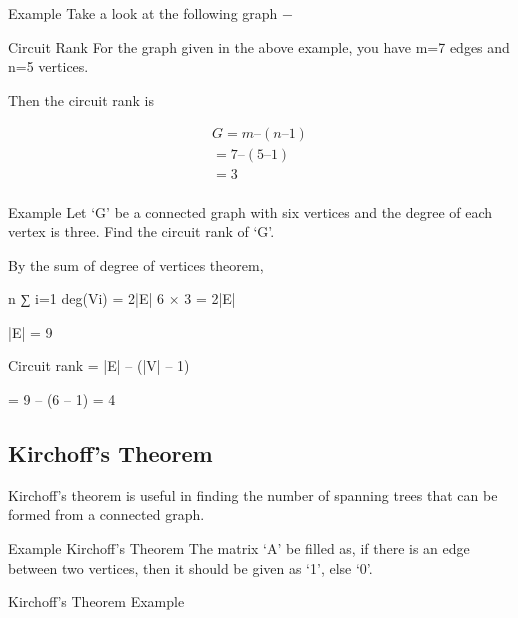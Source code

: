 Example
Take a look at the following graph −

Circuit Rank
For the graph given in the above example, you have m=7 edges and n=5 vertices.

Then the circuit rank is

\begin{eqnarray}
G = m – (n – 1)\\
  = 7 – (5 – 1)\\
  = 3\\
\end{eqnarray}

Example
Let ‘G’ be a connected graph with six vertices and the degree of each vertex is three. Find the circuit rank of ‘G’.

By the sum of degree of vertices theorem,

n
∑
i=1
 deg(Vi) = 2|E|
6 × 3 = 2|E|

|E| = 9

Circuit rank = |E| – (|V| – 1)

= 9 – (6 – 1) = 4

\subsection{Kirchoff’s Theorem}
Kirchoff’s theorem is useful in finding the number of spanning trees that can be formed from a connected graph.

Example
Kirchoff’s Theorem
The matrix ‘A’ be filled as, if there is an edge between two vertices, then it should be given as ‘1’, else ‘0’.

Kirchoff’s Theorem Example


\newpage




